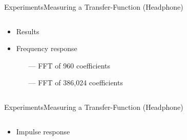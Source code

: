 \begin{frame}{Experiments}{Measuring a Transfer-Function (Headphone)}		
	\begin{columns}
		\begin{column}{0.3\textwidth}
			\begin{itemize}
				\item Results
				\item Frequency response
				\begin{itemize}
					\item[\textcolor{MATLABorange}{---}] FFT of 960 coefficients
					\item[\textcolor{MATLABblue}{---}] FFT of 386,024 coefficients
				\end{itemize}
			\end{itemize}
		\end{column}
		\begin{column}{0.7\textwidth} 
			\begin{figure}[h]
				
			\end{figure}
		\end{column}
	\end{columns}
\end{frame}
\begin{frame}{Experiments}{Measuring a Transfer-Function (Headphone)}		
	\begin{columns}
		\begin{column}{1\textwidth}
			\begin{itemize}
				\item Impulse response
			\end{itemize}
			\begin{figure}[h]
				
			\end{figure}
		\end{column}
	\end{columns}
\end{frame}


